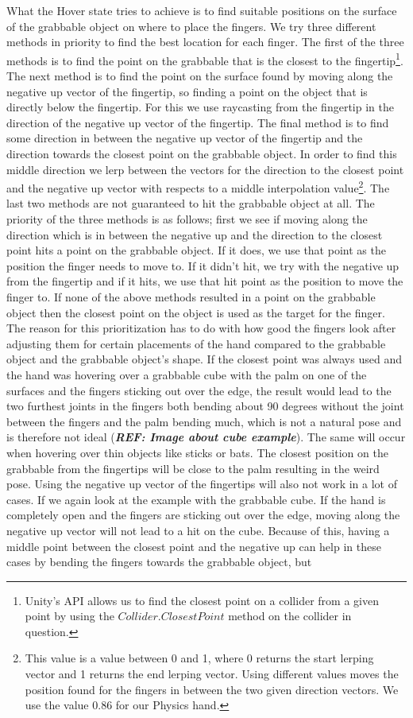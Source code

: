 What the Hover state tries to achieve is to find suitable positions on the surface of the grabbable object on where to place the fingers. We try three different methods in priority to find the best location for each finger. The first of the three methods is to find the point on the grabbable that is the closest to the fingertip\footnote{Unity's API allows us to find the closest point on a collider from a given point by using the $Collider.ClosestPoint$ method on the collider in question.}. The next method is to find the point on the surface found by moving along the negative up vector of the fingertip, so finding a point on the object that is directly below the fingertip. For this we use raycasting from the fingertip in the direction of the negative up vector of the fingertip. The final method is to find some direction in between the negative up vector of the fingertip and the direction towards the closest point on the grabbable object. In order to find this middle direction we lerp between the vectors for the direction to the closest point and the negative up vector with respects to a middle interpolation value\footnote{This value is a value between 0 and 1, where 0 returns the start lerping vector and 1 returns the end lerping vector. Using different values moves the position found for the fingers in between the two given direction vectors. We use the value 0.86 for our Physics hand.}. The last two methods are not guaranteed to hit the grabbable object at all. The priority of the three methods is as follows; first we see if moving along the direction which is in between the negative up and the direction to the closest point hits a point on the grabbable object. If it does, we use that point as the position the finger needs to move to. If it didn't hit, we try with the negative up from the fingertip and if it hits, we use that hit point as the position to move the finger to. If none of the above methods resulted in a point on the grabbable object then the closest point on the object is used as the target for the finger. The reason for this prioritization has to do with how good the fingers look after adjusting them for certain placements of the hand compared to the grabbable object and the grabbable object's shape. If the closest point was always used and the hand was hovering over a grabbable cube with the palm on one of the surfaces and the fingers sticking out over the edge, the result would lead to the two furthest joints in the fingers both bending about 90 degrees without the joint between the fingers and the palm bending much, which is not a natural pose and is therefore not ideal (\textbf{\textit{REF: Image about cube example}}). The same will occur when hovering over thin objects like sticks or bats. The closest position on the grabbable from the fingertips will be close to the palm resulting in the weird pose. Using the negative up vector of the fingertips will also not work in a lot of cases. If we again look at the example with the grabbable cube. If the hand is completely open and the fingers are sticking out over the edge, moving along the negative up vector will not lead to a hit on the cube. Because of this, having a middle point between the closest point and the negative up can help in these cases by bending the fingers towards the grabbable object, but 
